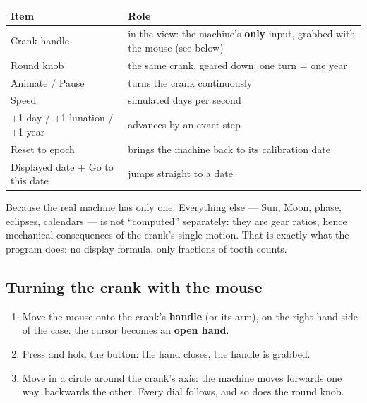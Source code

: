 \begin{center}
\begin{tabularx}{\textwidth}{@{}lX@{}}
\toprule
\rowcolor{lightblue}\textbf{Item} & \textbf{Role} \\
\midrule
Crank handle & in the view: the machine's \textbf{only} input, grabbed with the mouse (see
below) \\
Round knob & the same crank, geared down: one turn = one year \\
Animate / Pause & turns the crank continuously \\
Speed & simulated days per second \\
+1 day / +1 lunation / +1 year & advances by an exact step \\
Reset to epoch & brings the machine back to its calibration date \\
Displayed date + Go to this date & jumps straight to a date \\
\bottomrule
\end{tabularx}
\end{center}

\begin{info}
Because the real machine has only one. Everything else — Sun, Moon, phase, eclipses,
calendars — is not “computed” separately: they are gear ratios, hence mechanical
consequences of the crank's single motion. That is exactly what the program does: no display
formula, only fractions of tooth counts.
\end{info}

\subsection{Turning the crank with the mouse}


\begin{enumerate}
  \item Move the mouse onto the crank's \textbf{handle} (or its arm), on the right-hand side
        of the case: the cursor becomes an \textbf{open hand}.
  \item Press and hold the button: the hand closes, the handle is grabbed.
  \item Move in a circle around the crank's axis: the machine moves forwards one way,
        backwards the other. Every dial follows, and so does the round knob.
\end{enumerate}

